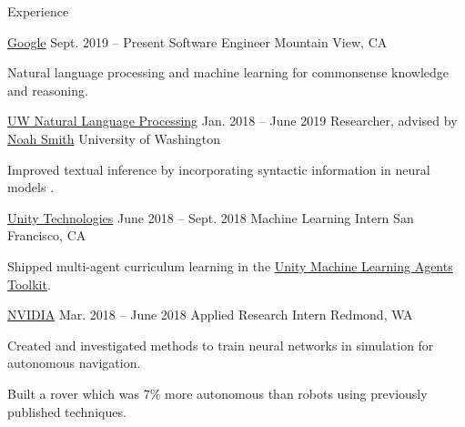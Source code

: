 \documentclass{resume}
\begin{document}
\begin{rSection}{Experience}
  \begin{rSubsection}{\href{https://careers.google.com/locations/mountain-view/}
                           {Google}}
                     {Sept. 2019 -- Present}
                     {Software Engineer}
                     {Mountain View, CA}
    \item Natural language processing and machine learning for commonsense
    knowledge and reasoning.
  \end{rSubsection}

  \begin{rSubsection}{\href{https://nlp.washington.edu/}
                           {UW Natural Language Processing}}
                     {Jan. 2018 -- June 2019}
                     {Researcher, advised by
                       \href{https://homes.cs.washington.edu/~nasmith/}
                            {Noah Smith}}
                     {University of Washington}
    \item Improved textual inference by incorporating syntactic
      information in neural models \citep{pang2019improving}.
  \end{rSubsection}

  \begin{rSubsection}{{\href{https://unity3d.ai/}{Unity Technologies}}}
                      {June 2018 -- Sept. 2018}
                      {Machine Learning Intern}
                      {San Francisco, CA}
    \item Shipped multi-agent curriculum learning in the
      \href{https://github.com/Unity-Technologies/ml-agents}
           {Unity Machine Learning Agents Toolkit}.
  \end{rSubsection}

  \begin{rSubsection}{{\href{http://www.nvidia.com/page/home.html}{NVIDIA}}}
                      {Mar. 2018 -- June 2018}
                      {Applied Research Intern}
                      {Redmond, WA}
    \item Created and investigated methods to train neural networks in
      simulation for autonomous navigation.
    \item Built a rover which was 7\% more autonomous than robots using
      previously published techniques.
  \end{rSubsection}


\end{rSection}
\end{document}
